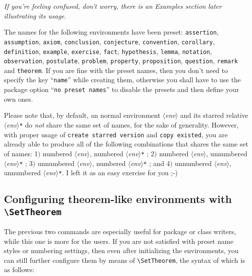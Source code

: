 \documentclass[classical]{einfart}
\providecommand{\meta}[1]{$\langle${\normalfont\itshape#1}$\rangle$}
\newenvironment{tip}[1][Tip]{%
    \LocallyStopLineNumbers%
    \begin{tcolorbox}[breakable,
        enhanced,
        width = \textwidth,
        colback = paper, colbacktitle = paper,
        colframe = gray!50, boxrule=0.2mm,
        coltitle = black,
        fonttitle = \sffamily,
        attach boxed title to top left = {yshift=-\tcboxedtitleheight/2, xshift=.5cm},
        boxed title style = {boxrule=0pt, colframe=paper},
        before skip = 3mm,
        after skip = 3mm,
        top = 2.5mm,
        bottom = 1.5mm,
        title={\scshape\sffamily #1}]%
}{\end{tcolorbox}\ResumeLineNumbers}
\newcommand{\packageoption}[1]{\texttt{\textcolor{black!67!green}{#1}}}
\newcommand{\commandoption}[1]{\texttt{\textcolor{black!67!cyan}{#1}}}
\begin{document}
\begin{center}
    \itshape
    If you're feeling confused, don't worry, there is an Examples section later illustrating its usage.
\end{center}

\begin{tip}
    The names for the following environments have been preset: \texttt{assertion}, \texttt{assumption}, \texttt{axiom}, \texttt{conclusion}, \texttt{conjecture}, \texttt{convention}, \texttt{corollary}, \texttt{definition}, \texttt{example}, \texttt{exercise}, \texttt{fact}, \texttt{hypothesis}, \texttt{lemma}, \texttt{notation}, \texttt{observation}, \texttt{postulate}, \texttt{problem}, \texttt{property}, \texttt{proposition}, \texttt{question}, \texttt{remark} and \texttt{theorem}. If you are fine with the preset names, then you don't need to specify the key ``\commandoption{name}'' while creating them, otherwise you shall have to use the package option ``\packageoption{no preset names}'' to disable the presets and then define your own ones.
\end{tip}

\medskip

Please note that, by default, an normal environment \meta{env} and its starred relative \meta{env}\texttt{*} do \emph{not} share the same set of names, for the sake of generality. However, with proper usage of \commandoption{create starred version} and \commandoption{copy existed}, you are already able to produce all of the following combinations that shares the same set of names: 1$)$ numbered \meta{env}, numbered \meta{env}\texttt{*} ; 2$)$ numbered \meta{env}, unnumbered \meta{env}\texttt{*} ; 3$)$ unnumbered \meta{env}, numbered \meta{env}\texttt{*} ; and 4$)$ unnumbered \meta{env}, unnumbered \meta{env}\texttt{*}. I left it as an easy exercise for you ;-)


\bigskip
\subsection[Configuring theorem-like environments]{Configuring theorem-like environments with \texttt{\textbackslash\textcolor{maintheme}{SetTheorem}}}

The previous two commands are especially useful for package or class writers, while this one is more for the users. If you are not satisfied with preset name styles or numbering settings, then even after initializing the environments, you can still further configure them by means of \lstinline|\SetTheorem|, the syntax of which is as follows:
\end{document}
